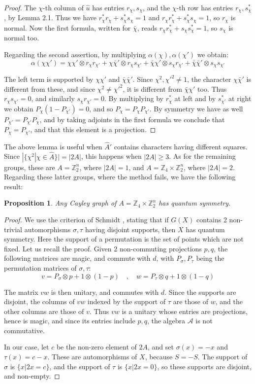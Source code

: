 \documentclass[11pt]{amsart}
\newtheorem{proposition}[theorem]{Proposition}
\newcommand{\A}{\mathcal A}
\newcommand{\Z}{\mathbb Z}
\newcommand{\hA}{\widehat A}
\newcommand{\hu}{\widehat u}
\newcommand{\bchi}{\bar\chi}
\begin{document}
\begin{proof}
The $\chi$-th column of $\hu$ has entries $r_\chi,s_\chi$, and the $\chi$-th row has entries $r_\chi,s_\chi^*$, by Lemma 2.1. Thus we have $r_\chi^*r_\chi+s_\chi^*s_\chi=1$ and $r_\chi r_\chi^*+s_\chi^*s_\chi=1$, so $r_\chi$ is normal. Now the first formula, written for $\bchi$, reads $r_\chi r_\chi^*+s_\chi s_\chi^*=1$, so $s_\chi$ is normal too.

Regarding the second assertion, by multiplying $\alpha(\chi),\alpha(\chi')$ we obtain:
$$\alpha(\chi\chi')=\chi\chi'\otimes r_\chi r_{\chi'}+\chi\bchi'\otimes r_\chi s_{\chi'}+\bchi\chi'\otimes s_\chi r_{\chi'}+\bchi\bchi'\otimes s_\chi s_{\chi'}$$

The left term is supported by $\chi\chi'$ and $\bchi\bchi'$. Since $\chi^2,\chi'^2\neq1$, the character $\chi\bchi'$ is different from these, and since $\chi^2\neq\chi'^2$, it is different from $\bchi\chi'$ too. Thus $r_\chi s_{\chi'}=0$, and similarly $s_\chi r_{\chi'}=0$. By multiplying by $r_\chi^*$ at left and by $s_{\chi'}^*$ at right we obtain $P_\chi(1-P_{\chi'})=0$, and so $P_\chi=P_\chi P_{\chi'}$. By symmetry we have as well $P_{\chi'}=P_{\chi'}P_\chi$, and by taking adjoints in the first formula we conclude that $P_\chi=P_{\chi'}$, and that this element is a projection.
\end{proof}

The above lemma is useful when $\hA'$ contains characters having different squares. Since $|\{\chi^2|\chi\in\hA\}|=|2A|$, this happens when $|2A|\geq3$. As for the remaining groups, these are $A=\Z_2^n$, where $|2A|=1$, and $A=\Z_4\times\Z_2^n$, where $|2A|=2$. Regarding these latter groups, where the method fails, we have the following result:

\begin{proposition}
Any Cayley graph of $A=\Z_4\times\Z_2^n$ has quantum symmetry.
\end{proposition}

\begin{proof}
We use the criterion of Schmidt \cite{sch}, stating that if $G(X)$ contains 2 non-trivial automorphisms $\sigma,\tau$ having disjoint supports, then $X$ has quantum symmetry. Here the support of a permutation is the set of points which are not fixed. Let us recall the proof. Given 2 non-commuting projections $p,q$, the following matrices are magic, and commute with $d$, with $P_\sigma,P_\tau$ being the permutation matrices of $\sigma,\tau$:
$$v=P_\sigma\otimes p+1\otimes(1-p)\quad,\quad w=P_\tau\otimes q+1\otimes(1-q)$$

The matrix $vw$ is then unitary, and commutes with $d$. Since the supports are disjoint, the columns of $vw$ indexed by the support of $\tau$ are those of $w$, and the other columns are those of $v$. Thus $vw$ is a unitary whose entries are projections, hence is magic, and since its entries include $p,q$, the algebra $\A$ is not commutative.

In our case, let $c$ be the non-zero element of $2A$, and set $\sigma(x)=-x$ and $\tau(x)=c-x$. These are automorphisms of $X$, because $S=-S$. The support of $\sigma$ is $\{x|2x=c\}$, and the support of $\tau$ is $\{x|2x=0\}$, so these supports are disjoint, and non-empty.
\end{proof}
\end{document}

